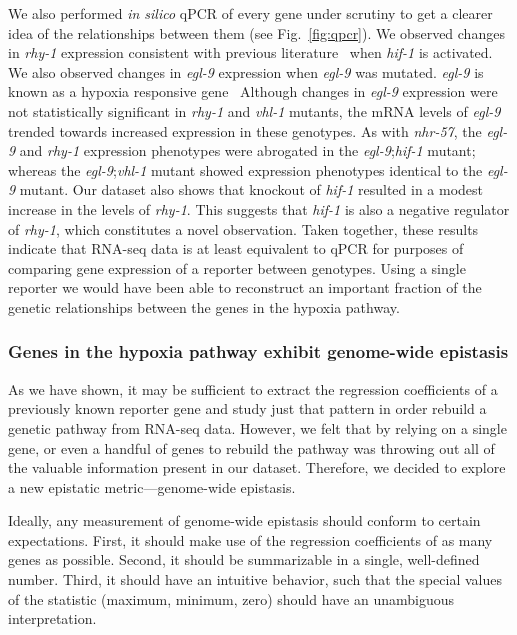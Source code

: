 \documentclass[9pt,twocolumn,twoside]{pnas-new}
\newcommand{\egl}{\emph{egl-9}}
\newcommand{\rhy}{\emph{rhy-1}}
\newcommand{\vhl}{\emph{vhl-1}}
\newcommand{\hif}{\emph{hif-1}}
\newcommand{\nhr}{\emph{nhr-57}}
\begin{document}
We also performed \emph{in silico} qPCR of every gene under scrutiny to get a
clearer idea of the relationships between them (see Fig.~\ref{fig:qpcr}). We
observed changes in \rhy{} expression consistent with previous
literature~\cite{Shen2006} when \hif{} is activated.
We also observed changes in \egl{}
expression when \egl{} was mutated. \egl{} is known as a hypoxia responsive
gene~\cite{Powell-Coffman2010} Although changes in \egl{} expression
were not statistically significant in \rhy{} and \vhl{} mutants, the mRNA levels
of \egl{} trended towards increased expression in these genotypes.
As with \nhr{}, the \egl{} and \rhy{} expression phenotypes were abrogated in
the \egl{};\hif{} mutant; whereas the \egl{};\vhl{} mutant showed expression
phenotypes identical to the \egl{} mutant.
Our dataset also shows that knockout of \hif{} resulted in a modest increase in
the levels of \rhy{}. This suggests that \hif{} is also a negative regulator of
\rhy{}, which constitutes a novel observation.
Taken together, these results indicate that RNA-seq data is at least equivalent
to qPCR for purposes of comparing gene expression of a reporter between genotypes.
Using a single reporter we would have been able to reconstruct an important fraction
of the genetic relationships between the genes in the hypoxia pathway.

\subsubsection*{Genes in the hypoxia pathway exhibit genome-wide epistasis}
As we have shown, it may be sufficient to extract the regression coefficients of a
previously known reporter gene and study just that pattern in order rebuild a
genetic pathway from RNA-seq data. However, we felt that by relying on a single
gene, or even a handful of genes to rebuild the pathway was throwing out all of
the valuable information present in our dataset. Therefore, we decided to
explore a new epistatic metric---genome-wide epistasis.

Ideally, any measurement of genome-wide epistasis should conform to certain
expectations. First, it should make use of the regression coefficients of as
many genes as possible. Second, it should be summarizable in a single,
well-defined number. Third, it should have an intuitive behavior, such that
the special values of the statistic (maximum, minimum, zero) should have an
unambiguous interpretation.
\end{document}
